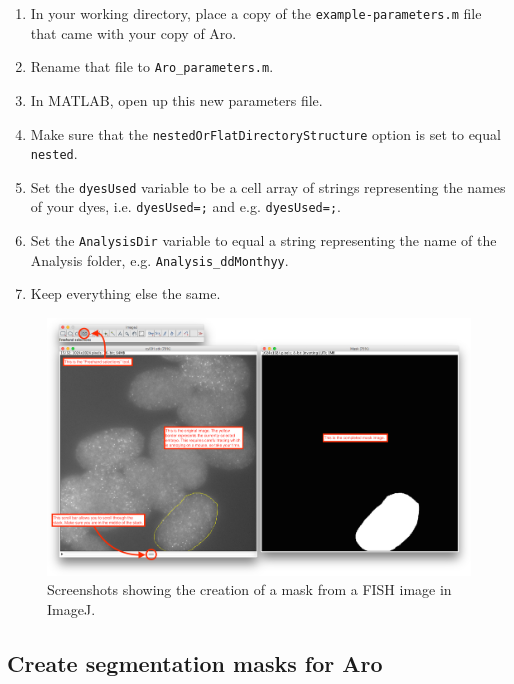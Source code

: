 \documentclass[titlepage,11pt]{article}
\begin{document}
\begin{enumerate}
\item In your working directory, place a copy of the \texttt{example-parameters.m} file that came with your copy of Aro.
\item Rename that file to \texttt{Aro\_parameters.m}.
\item In MATLAB, open up this new parameters file.
\item Make sure that the \texttt{nestedOrFlatDirectoryStructure} option is set to equal \texttt{\textquotesingle nested\textquotesingle}.
\item Set the \texttt{dyesUsed} variable to be a cell array of strings representing the names of your dyes, i.e. \texttt{dyesUsed=;} and e.g. \texttt{dyesUsed=;}.
\item Set the \texttt{AnalysisDir} variable to equal a string representing the name of the Analysis folder, e.g. \texttt{Analysis\_ddMonthyy}.
\item Keep everything else the same.
\end{enumerate}

\begin{landscape}
\begin{figure}
\includegraphics[scale=1.6]{masks.png}
\caption{Screenshots showing the creation of a mask from a FISH image in ImageJ.}
\label{fig:masks}
\end{figure}
\end{landscape}

\subsection{Create segmentation masks for Aro}\label{sec:createsegmasks}
\end{document}
